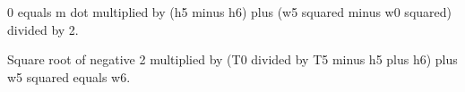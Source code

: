 0 equals m dot multiplied by (h5 minus h6) plus (w5 squared minus w0 squared) divided by 2.  

Square root of negative 2 multiplied by (T0 divided by T5 minus h5 plus h6) plus w5 squared equals w6.